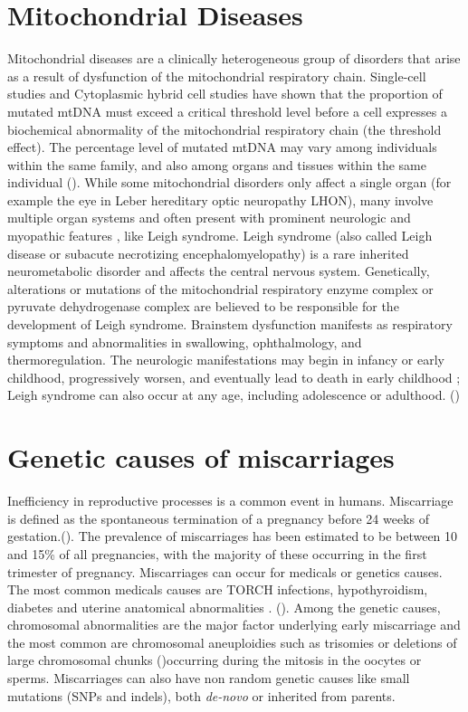\section{Mitochondrial Diseases}
Mitochondrial diseases are a clinically heterogeneous group of disorders that arise as a result of dysfunction of
the mitochondrial respiratory chain.
Single-cell studies and
Cytoplasmic hybrid cell studies have shown that the proportion of mutated mtDNA must exceed a critical threshold level before a cell expresses a biochemical abnormality of the mitochondrial respiratory chain (the threshold effect). The percentage level of mutated mtDNA may vary among individuals within the same family, and also among organs and tissues within the same individual (\cite{chinnery2014mitochondrial, thorburn2017mitochondrial}). 
While some mitochondrial disorders only affect a single organ (for example the eye in Leber hereditary optic neuropathy LHON), many involve multiple organ systems and often present with prominent neurologic and myopathic features , like Leigh syndrome.
Leigh syndrome (also called Leigh disease or subacute necrotizing
encephalomyelopathy) is a rare inherited neurometabolic disorder
and affects the central nervous system. 
Genetically, alterations or mutations of the mitochondrial
respiratory enzyme complex or pyruvate dehydrogenase complex are
believed to be responsible for the development of Leigh syndrome.
Brainstem dysfunction manifests as respiratory symptoms and
abnormalities in swallowing, ophthalmology, and thermoregulation. 
The neurologic manifestations may begin in infancy or early
childhood, progressively worsen, and eventually lead to death in
early childhood ; Leigh syndrome can also occur at any age, including adolescence or adulthood.
(\cite{chang2020meta})


\section{Genetic causes of miscarriages}
Inefficiency in reproductive processes is a common event in humans. Miscarriage is defined as the spontaneous termination of a pregnancy before 24 weeks of gestation.(\cite{larsen2013new, goddijn2000genetic}). The prevalence of miscarriages has been estimated to be between 10 and 15\% of all pregnancies, with the majority of these occurring in the first trimester of pregnancy.
Miscarriages can occur for medicals or genetics causes. The most common medicals causes are TORCH infections, hypothyroidism,  diabetes and  uterine  anatomical  abnormalities . (\cite{najafi2019chromosomal}). Among the genetic causes, chromosomal abnormalities are the major factor underlying early miscarriage and the most common are chromosomal aneuploidies such as trisomies or deletions of large chromosomal chunks (\cite{zhang2009genetic})occurring during the mitosis in the oocytes or sperms. Miscarriages can also have non random genetic causes like small mutations (SNPs and indels), both \textit{de-novo} or inherited from parents.

